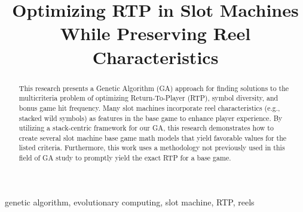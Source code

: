 \documentclass[conference]{IEEEtran}
\begin{document}
\title{Optimizing RTP in Slot Machines While Preserving Reel Characteristics\\
}

\author{
}

\maketitle

\begin{abstract}
This research presents a Genetic Algorithm (GA) approach for finding solutions to the multicriteria problem of optimizing Return-To-Player (RTP), symbol diversity, and bonus game hit frequency. Many slot machines incorporate reel characteristics (e.g., stacked wild symbols) as features in the base game to enhance player experience. By utilizing a stack-centric framework for our GA, this research demonstrates how to create several slot machine base game math models that yield favorable values for the listed criteria. Furthermore, this work uses a methodology not previously used in this field of GA study to promptly yield the exact RTP for a base game.
\end{abstract}

\begin{IEEEkeywords}
genetic algorithm, evolutionary computing, slot machine, RTP, reels
\end{IEEEkeywords}
\end{document}

